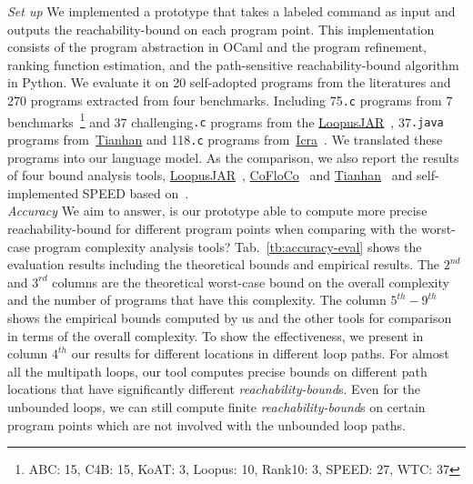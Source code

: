 \emph{Set up} We implemented a prototype {\THESYSTEM} that takes a labeled command as input 
and outputs the reachability-bound on each program point.
This implementation consists of the 
program abstraction in OCaml and the program refinement, ranking function estimation, and the path-sensitive reachability-bound algorithm in Python.
We evaluate it on 20 self-adopted programs from the literatures and 270 programs extracted from four benchmarks. 
Including 75{\tt .c} programs from 7 benchmarks~\cite{BenchmarkLoops}\footnote{ABC: 15, C4B: 15, KoAT: 3, Loopus: 10, Rank10: 3, SPEED: 27, WTC: 37} and 37 challenging{\tt .c} programs 
from the \hyperlink{https://forsyte.at/static/people/sinn/loopusJAR/index.html}{LoopusJAR}~\cite{BenchmarkLoops,SinnZV17},
37{\tt .java} programs from~\hyperlink{https://zenodo.org/record/5140586\#.Y5pBoC-B1QI}{Tianhan}\cite{BenchmarkTianhan,LuCT21}
and 118{\tt .c} programs from~\hyperlink{https://github.com/icra-team/icra}{Icra}~\cite{BenchmarkIcra,KincaidBCR19,CyphertBKR19}.
We translated these programs into our language model.
As the comparison, we also report the results of four bound analysis tools, 
\hyperlink{https://forsyte.at/software/loopus/}{LoopusJAR}~\cite{SinnZV17},
\hyperlink{https://github.com/aeflores/CoFloCo/tree/master/src}{CoFloCo}~\cite{ToolCofloco,Montoya17,Flores-Montoya16,Flores-MontoyaH14}
and \hyperlink{https://zenodo.org/record/5140586\#.Y5pBoC-B1QI}{Tianhan}~\cite{BenchmarkTianhan}
and self-implemented SPEED based on~\cite{GulwaniJK09}.
\\
\emph{Accuracy} We aim to answer, is our prototype able to compute more precise reachability-bound for different program points when comparing with the worst-case program
complexity analysis tools?
Tab.~\ref{tb:accuracy-eval} shows the evaluation results including the theoretical bounds and empirical results.
The $2^{nd}$ and $3^{rd}$ columns are the theoretical worst-case bound on the overall complexity and the number of programs that have this complexity. The column $5^{th}-9^{th}$ shows the empirical bounds computed by us and the other tools for comparison in terms of the overall complexity.
To show the effectiveness, 
we present in column $4^{th}$ our results for different locations in different loop paths. For almost all the multipath loops, our tool computes precise bounds on different path locations that have significantly different \emph{reachability-bound}s.
Even for the unbounded loops, we can still compute finite \emph{reachability-bound}s on certain program points which are not involved with the unbounded loop paths.
